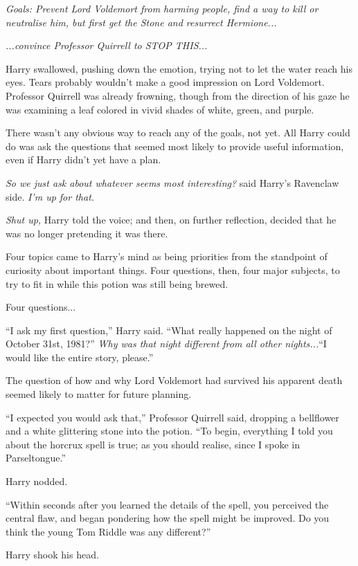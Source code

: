 \emph{Goals: Prevent Lord Voldemort from harming people, find a way to kill or neutralise him, but first get the Stone and resurrect Hermione...}

\emph{...convince Professor Quirrell to STOP THIS...}

Harry swallowed, pushing down the emotion, trying not to let the water reach his eyes. Tears probably wouldn't make a good impression on Lord Voldemort. Professor Quirrell was already frowning, though from the direction of his gaze he was examining a leaf colored in vivid shades of white, green, and purple.

There wasn't any obvious way to reach any of the goals, not yet. All Harry could do was ask the questions that seemed most likely to provide useful information, even if Harry didn't yet have a plan.

\emph{So we just ask about whatever seems most interesting?} said Harry's Ravenclaw side. \emph{I'm up for that.}

\emph{Shut up,} Harry told the voice; and then, on further reflection, decided that he was no longer pretending it was there.

Four topics came to Harry's mind as being priorities from the standpoint of curiosity about important things. Four questions, then, four major subjects, to try to fit in while this potion was still being brewed.

Four questions...

``I ask my first question,'' Harry said. ``What really happened on the night of October 31st, 1981?'' \emph{Why was that night different from all other nights...}``I would like the entire story, please.''

The question of how and why Lord Voldemort had survived his apparent death seemed likely to matter for future planning.

``I expected you would ask that,'' Professor Quirrell said, dropping a bellflower and a white glittering stone into the potion. ``To begin, everything I told you about the horcrux spell is true; as you should realise, since I spoke in Parseltongue.''

Harry nodded.

``Within seconds after you learned the details of the spell, you perceived the central flaw, and began pondering how the spell might be improved. Do you think the young Tom Riddle was any different?''

Harry shook his head.

